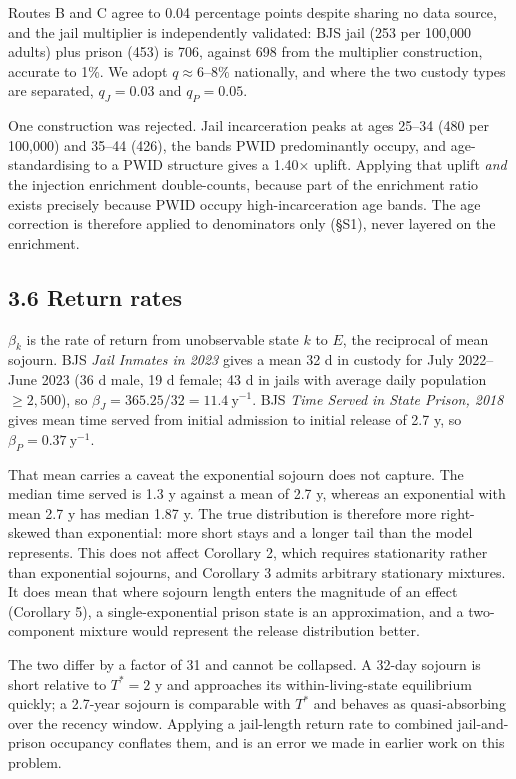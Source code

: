 Routes B and C agree to 0.04 percentage points despite sharing no data source, and the jail multiplier is independently validated: BJS jail (253 per 100,000 adults) plus prison (453) is 706, against 698 from the multiplier construction, accurate to 1\%. We adopt \(q\approx6\text{–}8\%\) nationally, and where the two custody types are separated, \(q_J=0.03\) and \(q_P=0.05\).

One construction was rejected. Jail incarceration peaks at ages 25--34 (480 per 100,000) and 35--44 (426), the bands PWID predominantly occupy, and age-standardising to a PWID structure gives a 1.40× uplift. Applying that uplift \emph{and} the injection enrichment double-counts, because part of the enrichment ratio exists precisely because PWID occupy high-incarceration age bands. The age correction is therefore applied to denominators only (§S1), never layered on the enrichment.

\subsection{3.6 Return rates}

\(\beta_k\) is the rate of return from unobservable state \(k\) to \(E\), the reciprocal of mean sojourn. BJS \emph{Jail Inmates in 2023} gives a mean 32 d in custody for July 2022--June 2023 (36 d male, 19 d female; 43 d in jails with average daily population \(\ge 2{,}500\)), so \(\beta_J=365.25/32=11.4\ \mathrm{y}^{-1}\). BJS \emph{Time Served in State Prison, 2018} gives mean time served from initial admission to initial release of 2.7 y, so \(\beta_P=0.37\ \mathrm{y}^{-1}\).

That mean carries a caveat the exponential sojourn does not capture. The median time served is 1.3 y against a mean of 2.7 y, whereas an exponential with mean 2.7 y has median 1.87 y. The true distribution is therefore more right-skewed than exponential: more short stays and a longer tail than the model represents. This does not affect Corollary 2, which requires stationarity rather than exponential sojourns, and Corollary 3 admits arbitrary stationary mixtures. It does mean that where sojourn length enters the magnitude of an effect (Corollary 5), a single-exponential prison state is an approximation, and a two-component mixture would represent the release distribution better.

The two differ by a factor of 31 and cannot be collapsed. A 32-day sojourn is short relative to \(T^*=2\) y and approaches its within-living-state equilibrium quickly; a 2.7-year sojourn is comparable with \(T^*\) and behaves as quasi-absorbing over the recency window. Applying a jail-length return rate to combined jail-and-prison occupancy conflates them, and is an error we made in earlier work on this problem.

